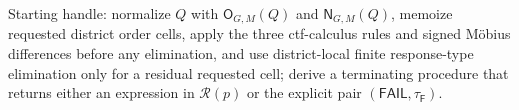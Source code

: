 Starting handle: normalize \(Q\) with \(\mathsf O_{G,M}(Q)\) and \(\mathsf N_{G,M}(Q)\), memoize requested district order cells, apply the three ctf-calculus rules and signed M\"obius differences before any elimination, and use district-local finite response-type elimination only for a residual requested cell; derive a terminating procedure that returns either an expression in \(\mathcal R(p)\) or the explicit pair \((\mathsf{FAIL},\tau_{\mathsf F})\).